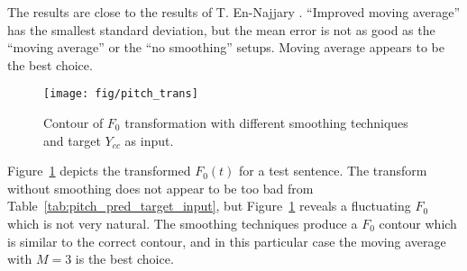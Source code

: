 
The results are close to the results of T. En-Najjary \etal \cite{najjary03new}. ``Improved moving average'' has the smallest standard deviation, but the mean error is not as good as the ``moving average'' or the ``no smoothing'' setups. Moving average appears to be the best choice. 

\begin{figure}[htbp]
	\begin{center}
		\texttt{[image: fig/pitch\_trans]}
		\caption{Contour of $F_0$ transformation with different smoothing techniques and target $Y_{cc}$ as input.}
		\label{fig:pitch_trans}
	\end{center}
\end{figure}
Figure~\ref{fig:pitch_trans} depicts the transformed $F_0(t)$ for a test sentence. The transform without smoothing does not appear to be too bad from Table~\ref{tab:pitch_pred_target_input}, but Figure~\ref{fig:pitch_trans} reveals a fluctuating $F_0$ which is not very natural. The smoothing techniques produce a $F_0$ contour which is similar to the correct contour, and in this particular case the moving average with $M=3$ is the best choice. 

